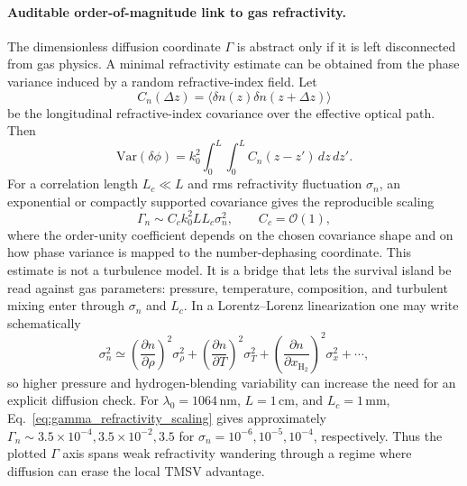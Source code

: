 \documentclass[a4paper,11pt]{article}
\numberwithin{equation}{section}
\begin{document}
\paragraph{Auditable order-of-magnitude link to gas refractivity.}
The dimensionless diffusion coordinate $\Gamma$ is abstract only if it is left disconnected from gas physics. A minimal refractivity estimate can be obtained from the phase variance induced by a random refractive-index field. Let
\begin{equation}
  C_n(\Delta z)=\langle \delta n(z)\delta n(z+\Delta z)\rangle
\end{equation}
be the longitudinal refractive-index covariance over the effective optical path. Then
\begin{equation}
  \mathrm{Var}(\delta\phi)=k_0^2\int_0^L\!\int_0^L C_n(z-z')\,dz\,dz'.
  \label{eq:phase_variance_index}
\end{equation}
For a correlation length $L_c\ll L$ and rms refractivity fluctuation $\sigma_n$, an exponential or compactly supported covariance gives the reproducible scaling
\begin{equation}
  \Gamma_n \sim C_c k_0^2 L L_c \sigma_n^2,
  \qquad C_c=\mathcal{O}(1),
  \label{eq:gamma_refractivity_scaling}
\end{equation}
where the order-unity coefficient depends on the chosen covariance shape and on how phase variance is mapped to the number-dephasing coordinate. This estimate is not a turbulence model. It is a bridge that lets the survival island be read against gas parameters: pressure, temperature, composition, and turbulent mixing enter through $\sigma_n$ and $L_c$. In a Lorentz--Lorenz linearization one may write schematically
\begin{equation}
  \sigma_n^2 \simeq
  \left(\frac{\partial n}{\partial \rho}\right)^2\sigma_\rho^2+
  \left(\frac{\partial n}{\partial T}\right)^2\sigma_T^2+
  \left(\frac{\partial n}{\partial x_{\mathrm{H}_2}}\right)^2\sigma_x^2+\cdots,
\end{equation}
so higher pressure and hydrogen-blending variability can increase the need for an explicit diffusion check. For $\lambda_0=1064\,\mathrm{nm}$, $L=1\,\mathrm{cm}$, and $L_c=1\,\mathrm{mm}$, Eq.~\eqref{eq:gamma_refractivity_scaling} gives approximately $\Gamma_n\sim3.5\times10^{-4},3.5\times10^{-2},3.5$ for $\sigma_n=10^{-6},10^{-5},10^{-4}$, respectively. Thus the plotted $\Gamma$ axis spans weak refractivity wandering through a regime where diffusion can erase the local TMSV advantage.
\end{document}
